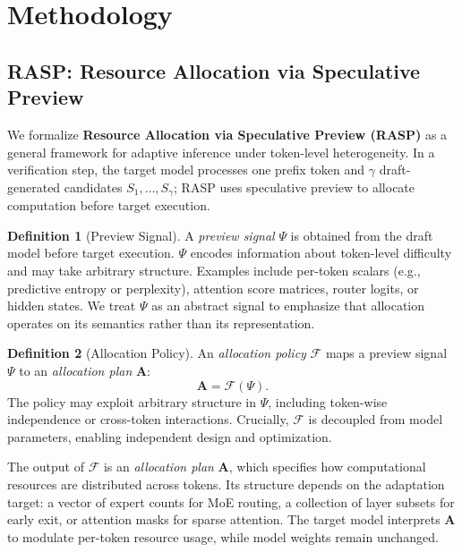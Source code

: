 \documentclass[conference]{IEEEtran}
\theoremstyle{definition} %
\newtheorem{definition}{Definition}[section] %
\begin{document}
\section{Methodology} \label{sec:methodology}

\subsection{RASP: Resource Allocation via Speculative Preview} \label{sec:method:rasp_framework}

We formalize \textbf{Resource Allocation via Speculative Preview (RASP)} as a general framework for adaptive inference under token-level heterogeneity. 
In a verification step, the target model processes one prefix token and $\gamma$ draft-generated candidates $S_1,\dots,S_\gamma$; RASP uses speculative preview to allocate computation before target execution.

\begin{definition}[Preview Signal]
A \emph{preview signal} $\Psi$ is obtained from the draft model before target execution. 
$\Psi$ encodes information about token-level difficulty and may take arbitrary structure. 
Examples include per-token scalars (e.g., predictive entropy or perplexity), attention score matrices, router logits, or hidden states. 
We treat $\Psi$ as an abstract signal to emphasize that allocation operates on its semantics rather than its representation.
\end{definition}

\begin{definition}[Allocation Policy]
An \emph{allocation policy} $\mathcal{F}$ maps a preview signal $\Psi$ to an \emph{allocation plan} $\mathbf{A}$:
\begin{equation}
\mathbf{A} = \mathcal{F}(\Psi).
\end{equation}
The policy may exploit arbitrary structure in $\Psi$, including token-wise independence or cross-token interactions. 
Crucially, $\mathcal{F}$ is decoupled from model parameters, enabling independent design and optimization.
\end{definition}

The output of $\mathcal{F}$ is an \emph{allocation plan} $\mathbf{A}$, which specifies how computational resources are distributed across tokens. 
Its structure depends on the adaptation target: a vector of expert counts for MoE routing, a collection of layer subsets for early exit, or attention masks for sparse attention. 
The target model interprets $\mathbf{A}$ to modulate per-token resource usage, while model weights remain unchanged.
\end{document}
